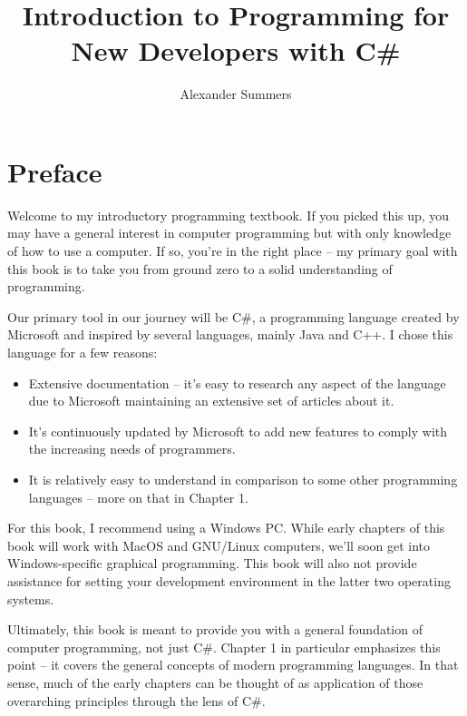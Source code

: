 \documentclass[oneside, openany] {book}
\begin{document}


\dominitoc
\title{Introduction to Programming for New Developers with C\#}
\date{}
\author{Alexander Summers}
\maketitle
\tableofcontents
\frontmatter
\chapter{Preface}

Welcome to my introductory programming textbook. If you picked this up, you may have a general interest in computer programming but with only knowledge of how to use a computer. If so, you're in the right place -- my primary goal with this book is to take you from ground zero to a solid understanding of programming.

Our primary tool in our journey will be C\#, a programming language created by Microsoft and inspired by several languages, mainly Java and C++. I chose this language for a few reasons:

\begin{itemize}
    \item Extensive documentation -- it's easy to research any aspect of the language due to Microsoft maintaining an extensive set of articles about it.
    \item It's continuously updated by Microsoft to add new features to comply with the increasing needs of programmers.
    \item It is relatively easy to understand in comparison to some other programming languages -- more on that in Chapter 1.
\end{itemize}
For this book, I recommend using a Windows PC. While early chapters of this book will work with MacOS and GNU/Linux computers, we'll soon get into Windows-specific graphical programming. This book will also not provide assistance for setting your development environment in the latter two operating systems.

Ultimately, this book is meant to provide you with a general foundation of computer programming, not just C\#. Chapter 1 in particular emphasizes this point -- it covers the general concepts of modern programming languages. In that sense, much of the early chapters can be thought of as application of those overarching principles through the lens of C\#.
\end{document}
